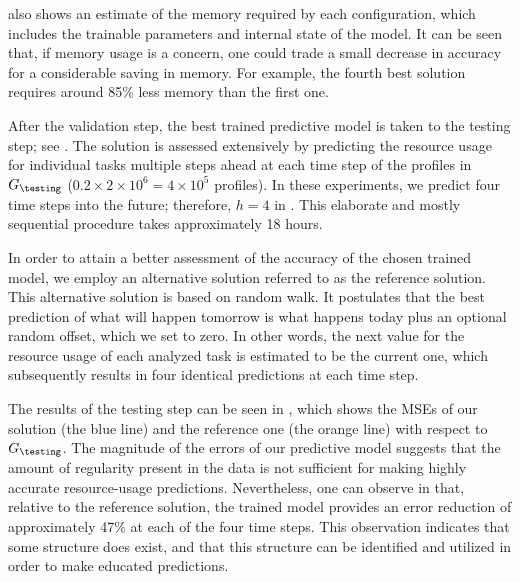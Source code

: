  also shows an estimate of the memory required by each
configuration, which includes the trainable parameters and internal state of the
model. It can be seen that, if memory usage is a concern, one could trade a
small decrease in accuracy for a considerable saving in memory. For example, the
fourth best solution requires around 85\% less memory than the first one.

After the validation step, the best trained predictive model is taken to the
testing step; see . The solution is assessed extensively by
predicting the resource usage for individual tasks multiple steps ahead at each
time step of the profiles in $G_\testing$ ($0.2 \times 2 \times 10^6 = 4 \times
10^5$ profiles). In these experiments, we predict four time steps into the
future; therefore, $h = 4$ in . This elaborate and mostly
sequential procedure takes approximately 18 hours.

In order to attain a better assessment of the accuracy of the chosen trained
model, we employ an alternative solution referred to as the reference solution.
This alternative solution is based on random walk. It postulates that the best
prediction of what will happen tomorrow is what happens today plus an optional
random offset, which we set to zero. In other words, the next value for the
resource usage of each analyzed task is estimated to be the current one, which
subsequently results in four identical predictions at each time step.

The results of the testing step can be seen in , which shows
the \acp{MSE} of our solution (the blue line) and the reference one (the orange
line) with respect to $G_\testing$. The magnitude of the errors of our
predictive model suggests that the amount of regularity present in the data is
not sufficient for making highly accurate resource-usage predictions.
Nevertheless, one can observe in  that, relative to the
reference solution, the trained model provides an error reduction of
approximately 47\% at each of the four time steps. This observation indicates
that some structure does exist, and that this structure can be identified and
utilized in order to make educated predictions.
